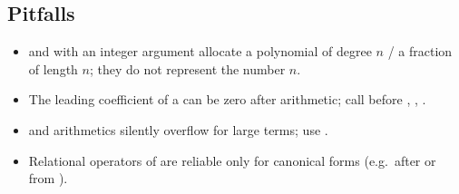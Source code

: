 \subsection{Pitfalls}
\begin{itemize}
\item {} and  with an integer argument allocate a polynomial of degree $n$ / a fraction of length $n$; they do not
	represent the number $n$.
\item The leading coefficient of a  can be zero after arithmetic; call  before , , .
\item {} and  arithmetics silently overflow for large terms; use .
\item Relational operators of  are reliable only for canonical forms (e.g.\ after  or from ).
\end{itemize}
